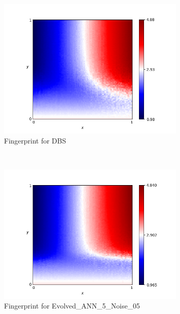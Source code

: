 \documentclass{article}
\begin{document}
\begin{figure}[!hbtp]
    \centering
    \begin{subfigure}[t]{.3\textwidth}
        \centering
        \includegraphics[width=\textwidth]{./assets/DBS.png}
        \caption{Fingerprint for DBS}
    \end{subfigure}%
    ~
    \begin{subfigure}[t]{.3\textwidth}
        \centering
        \includegraphics[width=\textwidth]{./assets/Evolved_ANN_5_Noise_05.png}
        \caption{Fingerprint for Evolved\_ANN\_5\_Noise\_05}
    \end{subfigure}%
    ~
    \begin{subfigure}[t]{.3\textwidth}
        \centering

\end{subfigure}
\end{figure}
\end{document}
